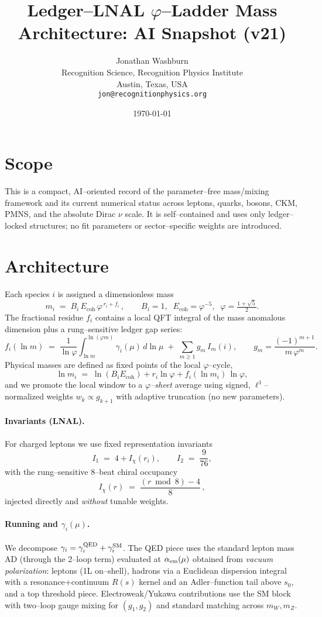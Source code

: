 \documentclass[11pt]{article}
\title{Ledger--LNAL $\varphi$--Ladder Mass Architecture: AI Snapshot (v21)}
\author{Jonathan Washburn\\
Recognition Science, Recognition Physics Institute\\
Austin, Texas, USA\\
\texttt{jon@recognitionphysics.org}}
\date{\today}
\begin{document}
\maketitle

\section*{Scope}
This is a compact, AI--oriented record of the parameter--free mass/mixing framework and its current numerical status across leptons, quarks, bosons, CKM, PMNS, and the absolute Dirac $\nu$ scale. It is self--contained and uses only ledger--locked structures; no fit parameters or sector--specific weights are introduced.

\section{Architecture}
Each species $i$ is assigned a dimensionless mass
\[
m_i \;=\; B_i\,E_{\mathrm{coh}}\,\varphi^{\,r_i + f_i}\,,\qquad
B_i=1,\;\; E_{\mathrm{coh}}=\varphi^{-5},\;\;\varphi=\tfrac{1+\sqrt5}{2}.
\]
The fractional residue $f_i$ contains a local QFT integral of the mass anomalous dimension plus a rung--sensitive ledger gap series:
\[
f_i(\ln m)\;=\;\frac{1}{\ln\varphi}\int_{\ln m}^{\ln(\varphi m)}\gamma_i(\mu)\,d\ln\mu
\;+\;\sum_{m\ge1} g_m\,I_m(i),\qquad
g_m=\frac{(-1)^{m+1}}{m\,\varphi^m}.
\]
Physical masses are defined as fixed points of the local $\varphi$--cycle,
\[
\ln m_i \;=\; \ln(B_iE_{\mathrm{coh}})+r_i\ln\varphi + f_i(\ln m_i)\,\ln\varphi,
\]
and we promote the local window to a \emph{$\varphi$--sheet} average using signed, $\ell^1$--normalized weights $w_k\propto g_{k+1}$ with adaptive truncation (no new parameters).

\paragraph{Invariants (LNAL).}
For charged leptons we use fixed representation invariants
\[
I_1 \;=\; 4 + I_\chi(r_i), \qquad I_2 \;=\; \frac{9}{76},
\]
with the rung--sensitive $8$--beat chiral occupancy
\[
I_\chi(r)\;=\;\frac{(r \bmod 8)-4}{8}\,,
\]
injected directly and \emph{without} tunable weights.

\paragraph{Running and $\gamma_i(\mu)$.}
We decompose $\gamma_i=\gamma_i^{\rm QED}+\gamma_i^{\rm SM}$.\newline
The QED piece uses the standard lepton mass AD (through the 2--loop term) evaluated at $\alpha_{\rm em}(\mu)$ obtained from \emph{vacuum polarization}: leptons (1L on--shell), hadrons via a Euclidean dispersion integral with a resonance{+}continuum $R(s)$ kernel and an Adler--function tail above $s_0$, and a top threshold piece. Electroweak/Yukawa contributions use the SM block with two--loop gauge mixing for $(g_1,g_2)$ and standard matching across $m_W,m_Z$.
\end{document}
